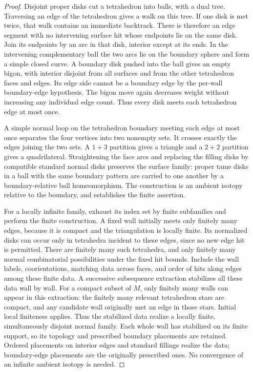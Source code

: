 \begin{proof}
Disjoint proper disks cut a tetrahedron into balls, with a dual tree.
Traversing an edge of the tetrahedron gives a walk on this tree.  If one disk
is met twice, that walk contains an immediate backtrack.  There is therefore
an edge segment with no intervening surface hit whose endpoints lie on the
same disk.  Join its endpoints by an arc in that disk, interior except at its
ends.  In the intervening complementary ball the two arcs lie on the boundary
sphere and form a simple closed curve.  A boundary disk pushed into the ball
gives an empty bigon, with interior disjoint from all surfaces and from the
other tetrahedron faces and edges.  Its edge side cannot be a boundary edge
by the per-wall boundary-edge hypothesis.  The bigon move again decreases
weight without increasing any individual edge count.  Thus every disk meets
each tetrahedron edge at most once.

A simple normal loop on the tetrahedron boundary meeting each edge at most
once separates the four vertices into two nonempty sets.  It crosses exactly
the edges joining the two sets.  A $1+3$ partition gives a triangle and a
$2+2$ partition gives a quadrilateral.  Straightening the face arcs and
replacing the filling disks by compatible standard normal disks preserves
the surface family: proper tame disks in a ball with the same boundary
pattern are carried to one another by a boundary-relative ball
homeomorphism.  The construction is an ambient isotopy relative to the
boundary, and establishes the finite assertion.

For a locally infinite family, exhaust its index set by finite subfamilies
and perform the finite construction.  A fixed wall initially meets only
finitely many edges, because it is compact and the triangulation is locally
finite.  Its normalized disks can occur only in tetrahedra incident to these
edges, since no new edge hit is permitted.  There are finitely many such
tetrahedra, and only finitely many normal combinatorial possibilities under
the fixed hit bounds.  Include the wall labels, coorientations, matching data
across faces, and order of hits along edges among these finite data.  A
successive subsequence extraction stabilizes all these data wall by wall.
For a compact subset of $M$, only finitely many walls can appear in this
extraction: the finitely many relevant tetrahedron stars are compact, and
any candidate wall originally met an edge in those stars.  Initial local
finiteness applies.  Thus the stabilized data realize a locally finite,
simultaneously disjoint normal family.  Each whole wall has stabilized on its
finite support, so its topology and prescribed boundary placements are
retained.  Ordered placements on interior edges and standard fillings realize
the data; boundary-edge placements are the originally prescribed ones.
No convergence of an infinite ambient isotopy is needed.
\end{proof}

